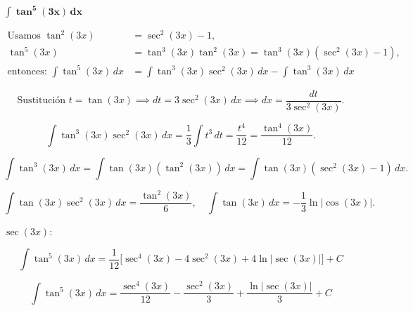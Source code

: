 $\displaystyle \mathbf{\int \tan^5(3x)\,dx}$

\nopagebreak
\begin{align*}
\text{Usamos } \tan^2(3x) &= \sec^2(3x)-1, \\[2pt]
\tan^5(3x) &= \tan^3(3x)\tan^2(3x) = \tan^3(3x)(\sec^2(3x)-1), \\[2pt]
\text{entonces: } \int \tan^5(3x)\,dx &= \int \tan^3(3x)\sec^2(3x)\,dx - \int \tan^3(3x)\,dx
\end{align*}

\[
\text{Sustitución } t = \tan(3x) \implies dt = 3\sec^2(3x)\,dx \implies dx = \frac{dt}{3\sec^2(3x)}.
\]

\[
\int \tan^3(3x)\sec^2(3x)\,dx = \frac{1}{3}\int t^3\,dt = \frac{t^4}{12} = \frac{\tan^4(3x)}{12}.
\]

\[
\int \tan^3(3x)\,dx = \int \tan(3x)(\tan^2(3x))\,dx = \int \tan(3x)(\sec^2(3x)-1)\,dx.
\]

\[
\int \tan(3x)\sec^2(3x)\,dx = \frac{\tan^2(3x)}{6}, \quad \int \tan(3x)\,dx = -\frac{1}{3}\ln|\cos(3x)|.
\]

\nopagebreak
{} $\sec(3x)$:

\[
\int \tan^5(3x)\,dx
= \frac{1}{12}\Big[\sec^4(3x) - 4\sec^2(3x) + 4\ln|\sec(3x)|\Big] + C
\]

\[
\boxed{
\displaystyle 
\int \tan^5(3x)\,dx
= \frac{\sec^4(3x)}{12}
- \frac{\sec^2(3x)}{3}
+ \frac{\ln|\sec(3x)|}{3}
+ C
}
\]
